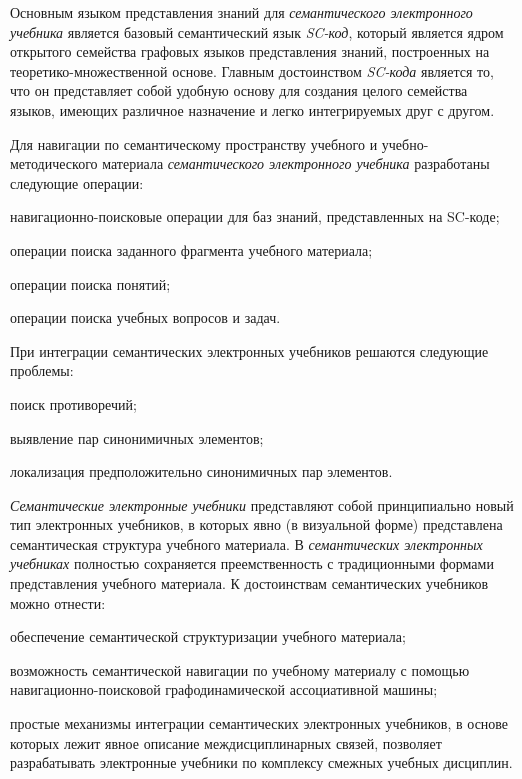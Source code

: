 Основным языком представления знаний для \textit{семантического электронного учебника} является базовый семантический язык \textit{SC-код}, который является ядром открытого семейства графовых языков представления знаний, построенных на теоретико-множественной основе. Главным достоинством \textit{SC-кода} является то, что он представляет собой удобную основу для создания целого семейства языков, имеющих различное назначение и легко интегрируемых друг с другом.

Для навигации по семантическому пространству учебного и учебно-методического материала \textit{семантического электронного учебника} разработаны следующие операции:

\begin{textitemize}
	\item навигационно-поисковые операции для баз знаний, представленных на SC-коде;
	\item операции поиска заданного фрагмента учебного материала;
	\item операции поиска понятий;
	\item операции поиска учебных вопросов и задач.
\end{textitemize}

При интеграции семантических электронных учебников решаются следующие проблемы:

\begin{textitemize}
	\item поиск противоречий;
	\item выявление пар синонимичных элементов;
	\item локализация предположительно синонимичных пар элементов.
\end{textitemize}

\textit{Семантические электронные учебники} представляют собой принципиально новый тип электронных учебников, в которых явно (в визуальной форме) представлена семантическая структура учебного материала. В \textit{семантических электронных учебниках} полностью сохраняется преемственность с традиционными формами представления учебного материала. К достоинствам семантических учебников можно отнести:

\begin{textitemize}
	\item
	обеспечение семантической структуризации учебного материала;
	\item
	возможность семантической навигации по учебному материалу с помощью навигационно-поисковой графодинамической ассоциативной машины;
	\item
	простые механизмы интеграции семантических электронных учебников, в основе которых лежит явное описание междисциплинарных связей, позволяет разрабатывать электронные учебники по комплексу смежных учебных дисциплин.
\end{textitemize}

